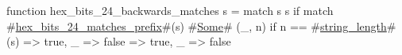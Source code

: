 function hex_bits_24_backwards_matches s = match s {
  s if match #\hyperref[sailRISCVzhexzybitszy24zymatcheszyprefix]{hex\_bits\_24\_matches\_prefix}#(s) {
    #\hyperref[sailRISCVzSome]{Some}# (_, n) if n == #\hyperref[sailRISCVzstringzylength]{string\_length}#(s) => true,
    _ => false
  } => true,
  _ => false
}
